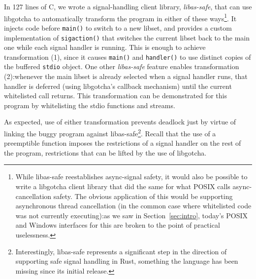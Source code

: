 In 127 lines of C, we wrote a signal-handling client library, \textit{libas-safe},
that can use libgotcha to automatically transform the program in either of these
ways\footnote{While libas-safe reestablishes async-signal safety, it would also be
possible to write a libgotcha client library that did the same for what POSIX calls
async-cancellation safety.  The obvious application of this would be supporting
asynchronous thread cancellation (in the common case where whitelisted code was not
currently executing):\@ as we saw in Section~\ref{sec:intro}, today's POSIX and
Windows interfaces for this are broken to the point of practical uselessness.}.  It
injects code before \texttt{main()} to switch to a new libset, and provides a custom
implementation of \texttt{sigaction()} that switches the current libset back to the
main one while each signal handler is running.  This is enough to achieve
transformation (1), since it causes \texttt{main()} and \texttt{handler()} to use
distinct copies of the buffered \texttt{stdio} object.  One other \textit{libas-safe}
feature enables transformation (2):\@ whenever the main libset is already selected
when a signal handler runs, that handler is deferred (using libgotcha's callback
mechanism) until the current whitelisted call returns.  This transformation can be
demonstrated for this program by whitelisting the stdio functions and streams.

As expected, use of either transformation prevents deadlock just by virtue of linking
the buggy program against libas-safe\footnote{Interestingly, libas-safe represents a
significant step in the direction of supporting safe signal handling in Rust,
something the language has been missing since its initial release.}.  Recall that the
use of a preemptible function imposes the restrictions of a signal handler on the
rest of the program, restrictions that can be lifted by the use of libgotcha.
